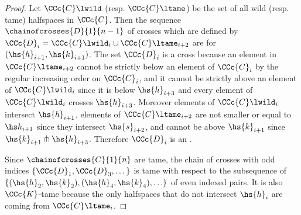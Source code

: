 \begin{proof}
	Let $\CCc{C}\lwild$ (resp. $\CCc{C}\ltame$) be the set of all wild (resp. tame) halfspaces in $\CCc{C}$. Then the sequence $\chainofcrosses{D}{1}{n-1}$ of crosses which are defined by $\CCc{D}_i = \CCc{C}\lwild_i \cup \CCc{C}\ltame_{i+2}$ are \intcs for $(\hs{h}_{i+1},\hs{k}_{i+1})$. %
	The set $\CCc{D}_i$ is a cross because an element in $\CCc{C}\ltame_{i+2}$ cannot be strictly below an element of $\CCc{C}_{i}$ by the regular increasing order on $\CCc{C}_i$, and it cannot be strictly above an element of $\CCc{C}\lwild_i$ since it is below $\hs{h}_{i+3}$ and every element of $\CCc{C}\lwild_i$ crosses $\hs{h}_{i+3}$. 
	Moreover elements of $\CCc{C}\lwild_i$ intersect $\hs{h}_{i+1}$, elements  of $\CCc{C}\ltame_{i+2}$ are not smaller or equal to $\hs h_{i+1}$ since they intersect $\hs{s}_{i+2}$, and cannot be above $\hs{k}_{i+1}$ since  $\hs{k}_{i+1} \pitchfork \hs{h}_{i+3}$. Therefore $\CCc{D}_i$ is an \intc.
	
	Since $\chainofcrosses{C}{1}{n}$ are tame, the chain of crosses with odd indices $\{\CCc{D}_1, \CCc{D}_3, \dots\}$ is tame with respect to the subsequence of $\{(\hs{h}_{2},\hs{k}_{2}),(\hs{h}_{4},\hs{k}_{4}),\ldots\}$ of even indexed pairs. 
	It is also $\CCc{K}$-tame because the only halfspaces that do not intersect $\hs{h}_i$ are coming from $\CCc{C}\ltame_{i}$.
\end{proof}





